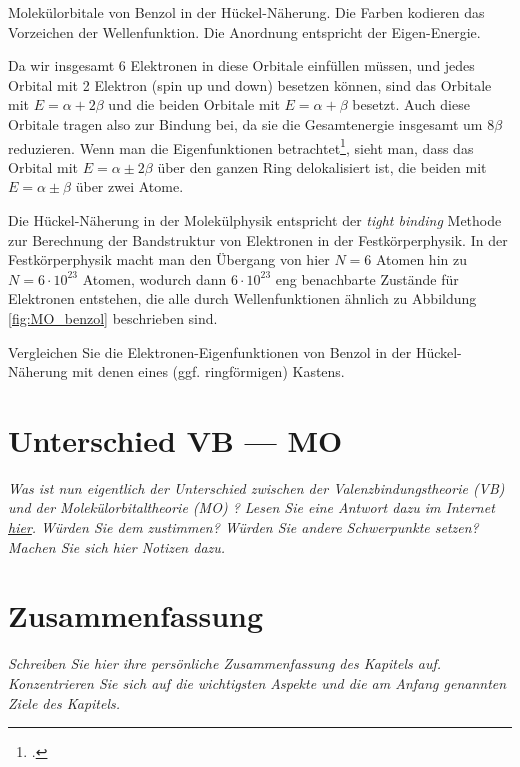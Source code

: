 \begin{marginfigure}[20mm]
\caption{Molekülorbitale von Benzol in der Hückel-Näherung. Die Farben kodieren das Vorzeichen der Wellenfunktion. Die Anordnung entspricht der Eigen-Energie.\label{fig:MO_benzol}}
\end{marginfigure}

Da wir insgesamt 6 Elektronen in diese Orbitale einfüllen müssen, und jedes Orbital mit 2 Elektron (spin up und down) besetzen können, sind das Orbitale mit $E=\alpha + 2 \beta$ und die beiden Orbitale mit $E = \alpha + \beta$ besetzt. Auch diese Orbitale tragen also zur Bindung bei, da sie die Gesamtenergie insgesamt um $8\beta$ reduzieren. Wenn man die Eigenfunktionen betrachtet\footcite{Atkins}, sieht man, dass  das Orbital mit $E=\alpha \pm 2 \beta$  über den ganzen Ring delokalisiert ist, die beiden mit $E = \alpha \pm \beta$  über zwei  Atome.


Die Hückel-Näherung in der Molekülphysik entspricht der \emph{tight binding} Methode zur Berechnung der Bandstruktur von Elektronen  in der Festkörperphysik. In der Festkörperphysik macht man den Übergang von hier $N=6$ Atomen hin zu $N= 6 \cdot 10^{23}$ Atomen, wodurch dann  $6 \cdot 10^{23}$ eng benachbarte Zustände für Elektronen entstehen, die alle durch Wellenfunktionen ähnlich zu Abbildung \ref{fig:MO_benzol} beschrieben sind.


\begin{questions} 
\item Vergleichen Sie die Elektronen-Eigenfunktionen von Benzol in der Hückel-Näherung mit denen eines (ggf. ringförmigen) Kastens.
\end{questions}


\section{Unterschied VB --- MO}

\textit{Was ist nun eigentlich der Unterschied zwischen der Valenzbindungstheorie (VB) und der Molekülorbitaltheorie (MO) ?  Lesen Sie eine Antwort dazu im Internet 
\href{https://socratic.org/questions/what-is-the-basic-difference-between-valence-bond-theory-and-molecular-orbital-t}{hier}.  Würden Sie dem zustimmen? Würden Sie andere Schwerpunkte setzen? Machen Sie sich hier  Notizen dazu.}


\vspace*{10cm}

\section{Zusammenfassung}

\textit{Schreiben Sie hier ihre persönliche Zusammenfassung des Kapitels auf. Konzentrieren Sie sich auf die wichtigsten Aspekte und die am Anfang genannten Ziele des Kapitels.}

\vspace*{10cm}



\printbibliography[segment=\therefsegment,heading=subbibliography]
